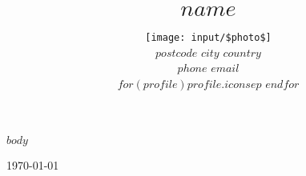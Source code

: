 \documentclass[a4paper]{article}
\title{\Large{\textsc{$name$}}\vspace{-.3cm}}
\author{
	\texttt{[image: input/\$photo\$]}\vspace{.3cm} \\
	$postcode$ \textbar{} $city$ \textbar{} $country$ \\
	$phone$ \textbar{} $email$ \\
	\large{$for(profile)$\href{$profile.url$}{$profile.icon$}$sep$ \textbar{} $endfor$}
}
\date{} %
\begin{document}
\maketitle
\vspace{-1cm}

$body$

\begin{flushright}
\vspace{2\baselineskip}
\noindent \today
\end{flushright}
\end{document}

